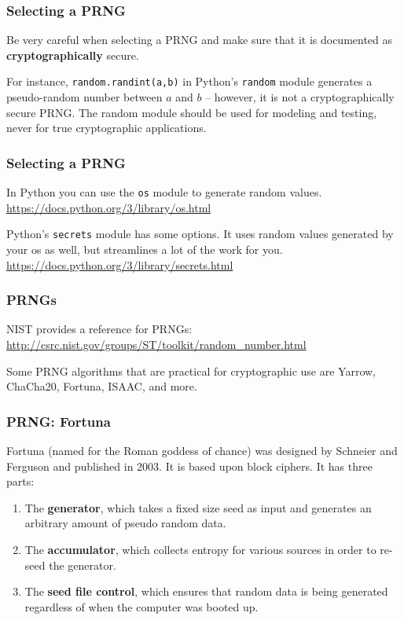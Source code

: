 \documentclass{beamer}
\newcommand{\<}{\langle}
\renewcommand{\>}{\rangle}
\begin{document}
\begin{frame}[fragile]
\frametitle{Selecting a PRNG}

Be very careful when selecting a PRNG and make sure that it is documented as \textbf{cryptographically} secure. \newline

For instance, \verb|random.randint(a,b)| in Python's \verb|random| module generates a pseudo-random number between $a$ and $b$ -- however, it is not a cryptographically secure PRNG. The random module should be used for modeling and testing, never for true cryptographic applications. \newline
\end{frame}

\begin{frame}[fragile]
\frametitle{Selecting a PRNG}

In Python you can use the \verb|os| module to generate random values. \url{https://docs.python.org/3/library/os.html}\newline

Python's \verb|secrets| module has some options. It uses random values generated by your os as well, but streamlines a lot of the work for you. \url{https://docs.python.org/3/library/secrets.html}
\end{frame}

\begin{frame}
\frametitle{PRNGs}

NIST provides a reference for PRNGs: \url{http://csrc.nist.gov/groups/ST/toolkit/random_number.html}\newline

Some PRNG algorithms that are practical for cryptographic use are Yarrow, ChaCha20, Fortuna, ISAAC, and more. 
\end{frame}

\begin{frame}
\frametitle{PRNG: Fortuna}

Fortuna (named for the Roman goddess of chance) was designed by Schneier and Ferguson and published in 2003. It is based upon block ciphers. It has three parts:
\begin{enumerate}[(1)]
\item The \textbf{generator}, which takes a fixed size seed as input and generates an arbitrary amount of pseudo random data.
\item The \textbf{accumulator}, which collects entropy for various sources in order to re-seed the generator.
\item The \textbf{seed file control}, which ensures that random data is being generated regardless of when the computer was booted up.
\end{enumerate}
\end{frame}
\end{document}
